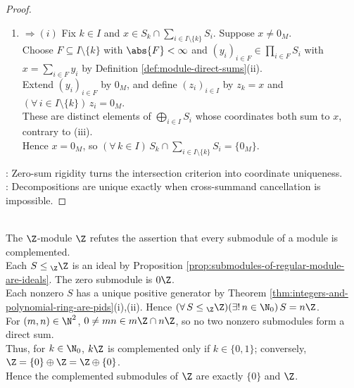 \begin{proposition}
\begin{proof}
\begin{enumerate}[label=(\roman*)]
\item[$(iii)$] $\Rightarrow (i)$ Fix $k\in I$ and $x\in S_k\cap\sum\limits_{i\in I\setminus\{k\}}S_i$. Suppose $x\neq0_M$.\\
Choose $F\subseteq I\setminus\{k\}$ with $\abs{F}<\infty$ and $(y_i)_{i\in F}\in\prod\limits_{i\in F}S_i$ with $x=\sum\limits_{i\in F}y_i$ by Definition \ref{def:module-direct-sums}(ii).\\
Extend $(y_i)_{i\in F}$ by $0_M$, and define $(z_i)_{i\in I}$ by $z_k=x$ and $(\forall\,i\in I\setminus\{k\})\,z_i=0_M$.\\
These are distinct elements of $\bigoplus\limits_{i\in I}S_i$ whose coordinates both sum to $x$, contrary to (iii).\\
Hence $x=0_M$, so $(\forall\,k\in I)\,S_k\cap\sum\limits_{i\in I\setminus\{k\}}S_i=\{0_M\}$.
\end{enumerate}
: Zero-sum rigidity turns the intersection criterion into coordinate uniqueness.\\
: Decompositions are unique exactly when cross-summand cancellation is impossible.
\end{proof}
\end{proposition}

\begin{counterexample} \label{cex:z-submodules-mostly-not-complemented} \\
The $\Z$-module $\Z$ refutes the assertion that every submodule of a module is complemented.\\
Each $S\leq{}_{\Z}\Z$ is an ideal by Proposition \ref{prop:submodules-of-regular-module-are-ideals}. The zero submodule is $0\Z$.\\
Each nonzero $S$ has a unique positive generator by Theorem \ref{thm:integers-and-polynomial-ring-are-pids}(i),(ii). Hence $(\forall\,S\leq{}_{\Z}\Z)(\exists!\,n\in\N_0)\,S=n\Z$.\\
For $(m,n)\in\N^2$, $0\neq mn\in m\Z\cap n\Z$, so no two nonzero submodules form a direct sum.\\
Thus, for $k\in\N_0$, $k\Z$ is complemented only if $k\in\{0,1\}$; conversely, $\Z=\{0\}\oplus\Z=\Z\oplus\{0\}$.\\
Hence the complemented submodules of $\Z$ are exactly $\{0\}$ and $\Z$.
\end{counterexample}


